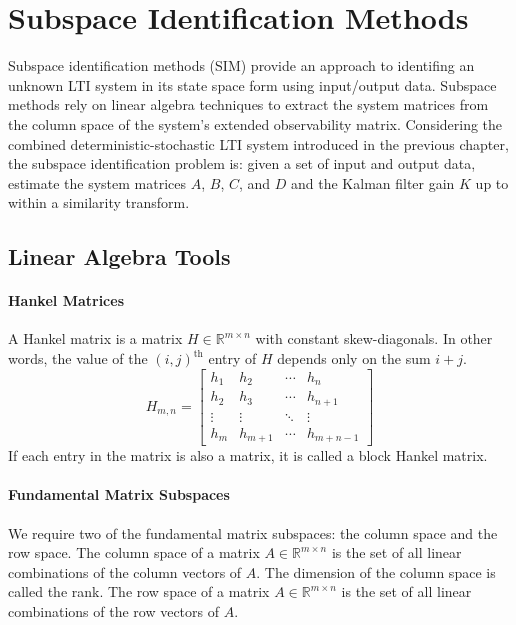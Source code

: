 \chapter{Subspace Identification Methods}
Subspace identification methods (SIM) provide an approach to identifing an unknown LTI system in its state space form using input/output data. Subspace methods rely on linear algebra techniques to extract the system matrices from the column space of the system's extended observability matrix. Considering the combined deterministic-stochastic LTI system introduced in the previous chapter, the subspace identification problem is: given a set of input and output data, estimate the system matrices $A$, $B$, $C$, and $D$ and the Kalman filter gain $K$ up to within a similarity transform. 




\section{Linear Algebra Tools}

\subsubsection*{Hankel Matrices}
A Hankel matrix is a matrix $H \in \mathbb{R}^{m\times n}$ with constant skew-diagonals. In other words, the value of the $(i, j)^{\mbox{th}}$ entry of $H$ depends only on the sum $i + j$.
\begin{equation*}
H_{m,n} = \begin{bmatrix}
h_1 & h_2 & \cdots & h_n\\
h_2 & h_3 & \cdots & h_{n+1}\\
\vdots & \vdots & \ddots & \vdots\\
h_m & h_{m+1} & \cdots & h_{m+n-1}
\end{bmatrix}
\end{equation*}
If each entry in the matrix is also a matrix, it is called a block Hankel matrix.


\subsubsection*{Fundamental Matrix Subspaces}
We require two of the fundamental matrix subspaces: the column space and the row space. The column space of a matrix $A \in \mathbb{R}^{m\times n}$ is the set of all linear combinations of the column vectors of $A$. The dimension of the column space is called the rank. The row space of a matrix $A \in \mathbb{R}^{m\times n}$ is the set of all linear combinations of the row vectors of $A$.


